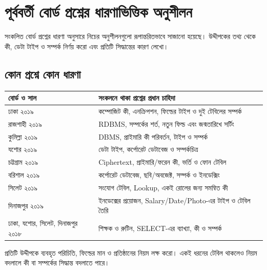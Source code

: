 \section{পূর্ববর্তী বোর্ড প্রশ্নের ধারণাভিত্তিক অনুশীলন}

সংকলিত বোর্ড প্রশ্নের ধারণা অনুসারে নিচের অনুশীলনগুলো রূপান্তরিতভাবে সাজানো হয়েছে। উদ্দীপকের তথ্য থেকে কী, ডেটা টাইপ ও সম্পর্ক নির্ণয় করো এবং প্রতিটি সিদ্ধান্তের কারণ লেখো।

\subsection{কোন প্রশ্নে কোন ধারণা}
\begin{flushleft}
\small
\begin{tabularx}{0.98\linewidth}{|p{30mm}|X|}\hline
বোর্ড ও সাল & সংকলনে থাকা প্রশ্নের প্রধান চাহিদা\\ \hline
ঢাকা ২০১৯ & কম্পোজিট কী, এনক্রিপশন, ফিল্ডের টাইপ ও দুই টেবিলের সম্পর্ক\\ \hline
রাজশাহী ২০১৯ & RDBMS, সম্পর্কের শর্ত, নতুন ফিল্ড এবং জন্মতারিখে সর্টিং\\ \hline
কুমিল্লা ২০১৯ & DBMS, প্রাইমারি কী পরিবর্তন, টাইপ ও সম্পর্ক\\ \hline
যশোর ২০১৯ & ডেটা টাইপ, কর্পোরেট ডেটাবেজ ও সম্পর্কচিত্র\\ \hline
চট্টগ্রাম ২০১৯ & Ciphertext, প্রাইমারি/ফরেন কী, ভর্তি ও ফোন টেবিল\\ \hline
বরিশাল ২০১৯ & কর্পোরেট ডেটাবেজ, ছবি/অবজেক্ট, সম্পর্ক ও ইনডেক্সিং\\ \hline
সিলেট ২০১৯ & সংযোগ টেবিল, Lookup, একই রোলের জন্য সমন্বিত কী\\ \hline
দিনাজপুর ২০১৯ & ইনডেক্সের প্রয়োজন, Salary/Date/Photo-এর টাইপ ও টেবিল তৈরি\\ \hline
ঢাকা, যশোর, সিলেট, দিনাজপুর ২০১৮ & শিক্ষক ও রুটিন, SELECT-এর ব্যাখ্যা, কী ও সম্পর্ক\\ \hline
\end{tabularx}
\end{flushleft}
প্রতিটি উদ্দীপকে ব্যবহৃত পরিচিতি, ফিল্ডের মান ও প্রতিষ্ঠানের নিয়ম লক্ষ করো। একই ধরনের টেবিল থাকলেও নিয়ম বদলালে কী বা সম্পর্কের সিদ্ধান্ত বদলাতে পারে।

